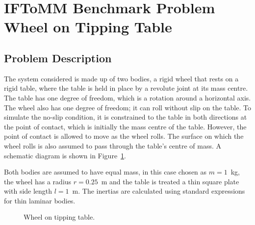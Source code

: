 \chapter*{IFToMM Benchmark Problem\\ Wheel on Tipping Table}
\section*{Problem Description}
\setcounter{chapter}{1}
The system considered is made up of two bodies, a rigid wheel that rests on a rigid table, where the table is held in place by a revolute joint at its mass centre.  The table has one degree of freedom, which is a rotation around a horizontal axis.  The wheel also has one degree of freedom; it can roll without slip on the table.  To simulate the no-slip condition, it is constrained to the table in both directions at the point of contact, which is initially the mass centre of the table.  However, the point of contact is allowed to move as the wheel rolls.  The surface on which the wheel rolls is also assumed to pass through the table's centre of mass.  A schematic diagram is shown in Figure~\ref{wheel}.

Both bodies are assumed to have equal mass, in this case chosen as $m=1$~\si{\kg}, the wheel has a radius $r=0.25$~\si{\m} and the table is treated a thin square plate with side length $l=1$~\si{\m}.  The inertias are calculated using standard expressions for thin laminar bodies.

\begin{figure}[hbtp]
\begin{center}

\caption{Wheel on tipping table.}
\label{wheel}
\end{center}
\end{figure}


